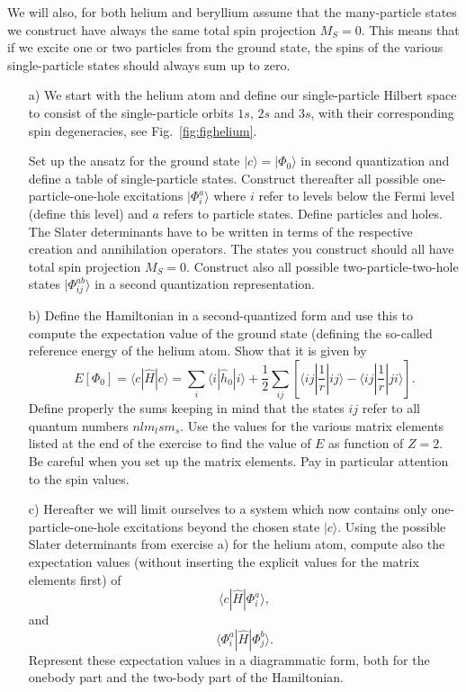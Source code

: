 \begin{prob}
We will also, for both helium and beryllium assume that the many-particle states we construct have always the same total spin projection $M_S=0$. This means that if we excite one or two particles from the ground state, the spins of the various single-particle states should always sum up to zero. 

\begin{enumerate}
\item[a)] We start with the helium atom and define our single-particle Hilbert space to consist of the single-particle orbits $1s$, $2s$ and $3s$, with their corresponding spin degeneracies, see Fig.~\ref{fig:fighelium}. 

Set up the ansatz for the ground state $|c\rangle = |\Phi_0\rangle$ in second 
quantization and define a table of single-particle states. Construct thereafter
all possible one-particle-one-hole excitations  $|\Phi_i^a\rangle$ where $i$ refer to levels below the Fermi level (define this level) and $a$ refers to particle states. Define particles and holes. The Slater determinants have to be written in terms of the respective creation and annihilation operators.
The states you construct should all have total spin projection $M_S=0$. 
Construct also all possible two-particle-two-hole states $|\Phi_{ij}^{ab}\rangle$  in a second quantization representation. 


\item[b)]  Define the Hamiltonian in a second-quantized form and use this to
compute the expectation value of the ground state (defining the so-called reference energy of the helium atom. 
Show that it is given by
\[
  E[\Phi_0] = \langle c | \hat{H}| c \rangle 
  = \sum_{i} \langle i | \hat{h}_0 | i\rangle+ \frac{1}{2}\sum_{ij}\left[\langle ij |\frac{1}{r}|ij\rangle-\langle ij |\frac{1}{r}|ji\rangle\right].
\]
Define properly the sums keeping in mind that the states $ij$ refer to all
quantum numbers $nlm_lsm_s$.
Use the values for the various matrix elements listed at the end of the exercise to find the value of $E$
as function of $Z=2$.
Be careful when you set up the matrix elements. Pay in particular attention to the spin values.
\item[c)]
Hereafter we will limit ourselves to a system which now contains only one-particle-one-hole
excitations beyond the chosen state $|c\rangle$.
Using the possible Slater determinants from exercise a) for the helium atom,   
compute also the expectation values (without inserting the explicit values for the matrix elements first) of 
\[
\langle c | \hat{H}| \Phi_i^a \rangle,
\] 
and 
\[
\langle \Phi_i^a | \hat{H}| \Phi_j^b \rangle.
\]
Represent these expectation values in a diagrammatic form, both for the onebody part and the two-body part of the Hamiltonian. 
 

\end{enumerate}
\end{prob}

